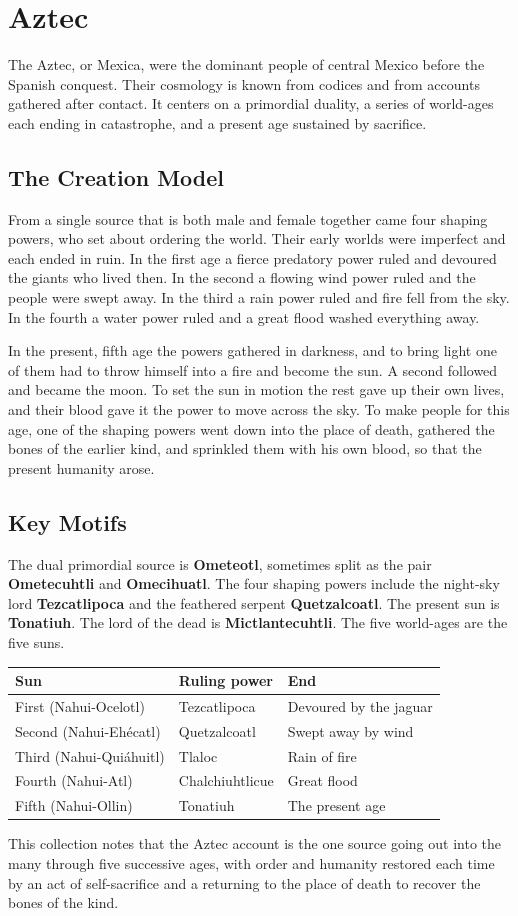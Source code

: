 \section{Aztec}

The Aztec, or Mexica, were the dominant people of central Mexico before the Spanish conquest. Their cosmology is known from codices and from accounts gathered after contact. It centers on a primordial duality, a series of world-ages each ending in catastrophe, and a present age sustained by sacrifice.

\subsection{The Creation Model}

From a single source that is both male and female together came four shaping powers, who set about ordering the world. Their early worlds were imperfect and each ended in ruin. In the first age a fierce predatory power ruled and devoured the giants who lived then. In the second a flowing wind power ruled and the people were swept away. In the third a rain power ruled and fire fell from the sky. In the fourth a water power ruled and a great flood washed everything away.

In the present, fifth age the powers gathered in darkness, and to bring light one of them had to throw himself into a fire and become the sun. A second followed and became the moon. To set the sun in motion the rest gave up their own lives, and their blood gave it the power to move across the sky. To make people for this age, one of the shaping powers went down into the place of death, gathered the bones of the earlier kind, and sprinkled them with his own blood, so that the present humanity arose.

\subsection{Key Motifs}

The dual primordial source is \textbf{Ometeotl}, sometimes split as the pair \textbf{Ometecuhtli} and \textbf{Omecihuatl}. The four shaping powers include the night-sky lord \textbf{Tezcatlipoca} and the feathered serpent \textbf{Quetzalcoatl}. The present sun is \textbf{Tonatiuh}. The lord of the dead is \textbf{Mictlantecuhtli}. The five world-ages are the five suns.

\begin{longtable}{lll}
\toprule
\textbf{Sun} & \textbf{Ruling power} & \textbf{End} \\
\midrule
First (Nahui-Ocelotl) & Tezcatlipoca & Devoured by the jaguar \\
Second (Nahui-Eh\'ecatl) & Quetzalcoatl & Swept away by wind \\
Third (Nahui-Qui\'ahuitl) & Tlaloc & Rain of fire \\
Fourth (Nahui-Atl) & Chalchiuhtlicue & Great flood \\
Fifth (Nahui-Ollin) & Tonatiuh & The present age \\
\bottomrule
\end{longtable}

This collection notes that the Aztec account is the one source going out into the many through five successive ages, with order and humanity restored each time by an act of self-sacrifice and a returning to the place of death to recover the bones of the kind.
